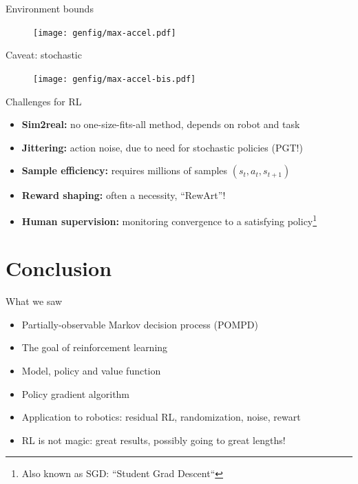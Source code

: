 \documentclass[10pt, aspectratio=1610]{beamer}
\begin{document}
\begin{frame}{Environment bounds}
    \begin{figure}
        \centering
        \texttt{[image: genfig/max-accel.pdf]}
    \end{figure}
\end{frame}

\begin{frame}{Caveat: stochastic}
    \begin{figure}
        \centering
        \texttt{[image: genfig/max-accel-bis.pdf]}
    \end{figure}
\end{frame}


\begin{frame}{Challenges for RL}
    \begin{itemize}
        \item \textbf{Sim2real:} no one-size-fits-all method, depends on robot and task
        \item \textbf{Jittering:} action noise, due to need for stochastic policies (PGT!)
        \item \textbf{Sample efficiency:} requires millions of samples $(s_t, a_t, s_{t+1})$
        \item \textbf{Reward shaping:} often a necessity, ``RewArt''!
        \item \textbf{Human supervision:} monitoring convergence to a satisfying policy\footnote{ Also known as SGD: ``Student Grad Descent``}
    \end{itemize}
\end{frame}

\section{Conclusion}

\begin{frame}{What we saw}
    \begin{itemize}
        \item Partially-observable Markov decision process (POMPD)
        \item The goal of reinforcement learning
        \item Model, policy and value function
        \item Policy gradient algorithm
        \item Application to robotics: residual RL, randomization, noise, rewart
        \item RL is not magic: great results, possibly going to great lengths!
    \end{itemize}
\end{frame}
\end{document}
